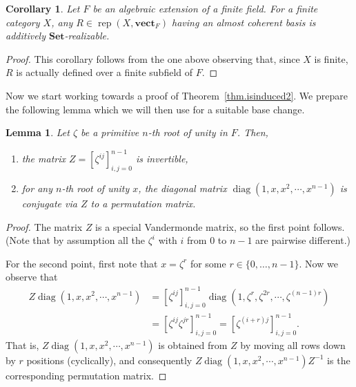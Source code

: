 \documentclass[a4paper]{amsart}
\theoremstyle{plain}
\newtheorem{lemma}[theorem]{Lemma}
\newtheorem{corollary}[theorem]{Corollary}
\theoremstyle{definition}
\theoremstyle{remark}
\newcommand{\Set}{\mathbf{Set}}
\newcommand{\vectF}{\mathbf{vect}_F}
\DeclareMathOperator{\rep}{rep}
\begin{document}
\begin{corollary} \label{cor.finite_cat_is_enough}
Let \( F \) be an algebraic extension of a finite field. For a finite category \( X \), any \( R \in \rep(X, \vectF) \) having an almost coherent basis is additively \( \Set \)-realizable.
\end{corollary}

\begin{proof}
This corollary follows from the one above observing that, since \( X \) is finite, \( R \) is actually defined over a finite subfield of \( F \).
\end{proof}

Now we start working towards a proof of Theorem~\ref{thm.isinduced2}. We prepare the following lemma which we will then use for a suitable base change.

\begin{lemma} \label{lem.base_change}
Let \( \zeta \) be a primitive \( n \)-th root of unity in $F$. Then, 
\begin{enumerate}
\item the matrix \( Z = [ \zeta^{ij} ]_{i,j=0}^{n-1} \) is invertible,
\item for any \( n \)-th root of unity \( x \), the diagonal matrix \( \operatorname{diag}(1, x, x^2, \cdots, x^{n-1}) \) is conjugate via \( Z \) to a permutation matrix.
\end{enumerate}
\end{lemma}

\begin{proof}
The matrix \( Z \) is a special Vandermonde matrix, so the first point follows. (Note that by assumption all the \( \zeta^i \) with \( i \) from \( 0 \) to \( n-1 \) are pairwise different.)

For the second point, first note that \( x = \zeta^r \) for some \(r \in \{ 0, \ldots, n-1 \} \). Now we observe that
\begin{align*}
Z \operatorname{diag}(1, x, x^2, \cdots, x^{n-1}) & = [ \zeta^{ij} ]_{i,j=0}^{n-1} \operatorname{diag}(1, \zeta^r, \zeta^{2r}, \cdots, \zeta^{(n-1)r}) \\
& = [\zeta^{ij} \zeta^{jr}]_{i,j = 0}^{n-1} = [\zeta^{(i+r)j}]_{i,j = 0}^{n-1}.
\end{align*}
That is, \( Z \operatorname{diag}(1, x, x^2, \cdots, x^{n-1}) \) is obtained from \( Z \) by moving all rows down by \( r \) positions (cyclically), and consequently \( Z \operatorname{diag}(1, x, x^2, \cdots, x^{n-1}) Z^{-1} \) is the corresponding permutation matrix.
\end{proof}
\end{document}
